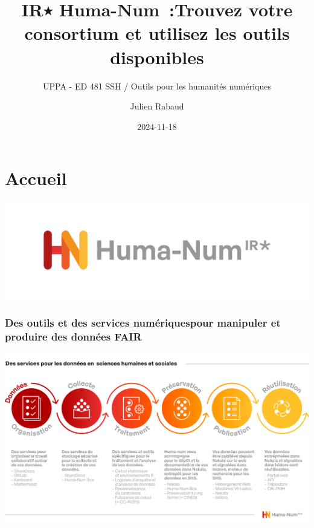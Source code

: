 \documentclass[
  letterpaper,
  DIV=11,
  numbers=noendperiod]{scrreport}
\title{IR٭ \textbf{Huma-Num}~:Trouvez votre \textbf{consortium} et
utilisez les \textbf{outils} disponibles}
\subtitle{UPPA - ED 481 SSH / Outils pour les humanités numériques}
\author{Julien Rabaud}
\date{2024-11-18}
\renewcommand*\contentsname{Table des matières}
\newcommand\contentsname{Table des matières}
\begin{document}
\maketitle

\renewcommand*\contentsname{Table des matières}
{
\hypersetup{linkcolor=}
\setcounter{tocdepth}{2}
\tableofcontents
}
\listoffigures
\listoftables


\chapter{Accueil}\label{accueil}

\begin{center}
\includegraphics{IMG/HN_LOGO_COULEUR-RVB_Logo-scaled.jpg}
\end{center}

\subsection{\texorpdfstring{Des outils et des services numériquespour
manipuler et produire des données
\textbf{FAIR}}{Des outils et des services numériques pour manipuler et produire des données FAIR}}\label{des-outils-et-des-services-numuxe9riques-pour-manipuler-et-produire-des-donnuxe9es-fair}

\includegraphics{IMG/Schema-du-cycle-de-vie-des-donnees-HN_2023_FR-2-scaled.jpg}
\end{document}
